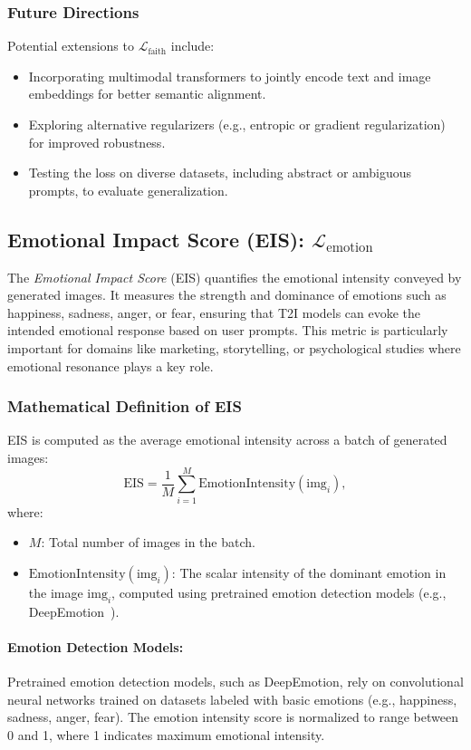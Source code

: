 \subsubsection{Future Directions}
Potential extensions to \(\mathcal{L}_{\text{faith}}\) include:
\begin{itemize}
    \item Incorporating multimodal transformers to jointly encode text and image embeddings for better semantic alignment.
    \item Exploring alternative regularizers (e.g., entropic or gradient regularization) for improved robustness.
    \item Testing the loss on diverse datasets, including abstract or ambiguous prompts, to evaluate generalization.
\end{itemize}


\subsection{Emotional Impact Score (EIS): \(\mathcal{L}_{\text{emotion}}\)}

The \textit{Emotional Impact Score} (EIS) quantifies the emotional intensity conveyed by generated images. It measures the strength and dominance of emotions such as happiness, sadness, anger, or fear, ensuring that T2I models can evoke the intended emotional response based on user prompts. This metric is particularly important for domains like marketing, storytelling, or psychological studies where emotional resonance plays a key role.

\subsubsection{Mathematical Definition of EIS}
EIS is computed as the average emotional intensity across a batch of generated images:
\[
\text{EIS} = \frac{1}{M} \sum_{i=1}^M \text{EmotionIntensity}(\text{img}_i),
\]
where:
\begin{itemize}
    \item \(M\): Total number of images in the batch.
    \item \(\text{EmotionIntensity}(\text{img}_i)\): The scalar intensity of the dominant emotion in the image \(\text{img}_i\), computed using pretrained emotion detection models (e.g., DeepEmotion~\cite{abidin2018deepemotion}).
\end{itemize}

\paragraph{Emotion Detection Models:}
Pretrained emotion detection models, such as DeepEmotion, rely on convolutional neural networks trained on datasets labeled with basic emotions (e.g., happiness, sadness, anger, fear). The emotion intensity score is normalized to range between 0 and 1, where 1 indicates maximum emotional intensity.


